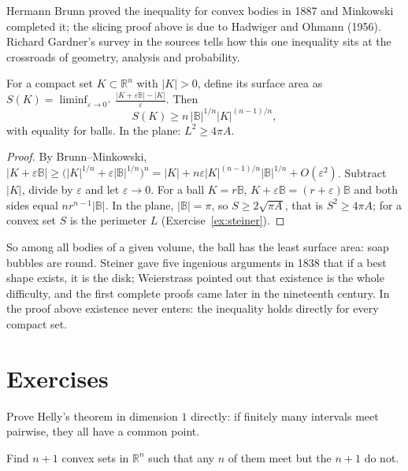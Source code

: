 Hermann Brunn proved the inequality for convex bodies in 1887 and Minkowski completed it; the slicing proof above is due to Hadwiger and Ohmann (1956).
Richard Gardner's survey in the sources tells how this one inequality sits at the crossroads of geometry, analysis and probability.

\begin{corollary}\label{cor:isoperimetric}
For a compact set $K\subset\mathbb R^n$ with $|K|>0$, define its surface area as $S(K)=\liminf_{\varepsilon\to0^+}\frac{|K+\varepsilon\mathbb B|-|K|}\varepsilon$. Then
\[
S(K)\ge n\,|\mathbb B|^{1/n}|K|^{(n-1)/n},
\]
with equality for balls. In the plane: $L^2\ge4\pi A$.
\end{corollary}

\begin{proof}
By Brunn--Minkowski, $|K+\varepsilon\mathbb B|\ge\bigl(|K|^{1/n}+\varepsilon|\mathbb B|^{1/n}\bigr)^n=|K|+n\varepsilon|K|^{(n-1)/n}|\mathbb B|^{1/n}+O(\varepsilon^2)$.
Subtract $|K|$, divide by $\varepsilon$ and let $\varepsilon\to0$. For a ball $K=r\mathbb B$, $K+\varepsilon\mathbb B=(r+\varepsilon)\mathbb B$ and both sides equal
$nr^{n-1}|\mathbb B|$. In the plane, $|\mathbb B|=\pi$, so $S\ge2\sqrt{\pi A}$, that is $S^2\ge4\pi A$; for a convex set $S$ is the perimeter $L$
(Exercise~\ref{ex:steiner}).
\end{proof}

So among all bodies of a given volume, the ball has the least surface area: soap bubbles are round. Steiner gave five ingenious arguments in 1838 that if a
best shape exists, it is the disk; Weierstrass pointed out that existence is the whole difficulty, and the first complete proofs came later in the
nineteenth century. In the proof above existence never enters: the inequality holds directly for every compact set.

\section{Exercises}

\begin{exercise}[$\star$]\label{ex:helly1d}
Prove Helly's theorem in dimension $1$ directly: if finitely many intervals meet pairwise, they all have a common point.
\end{exercise}

\begin{exercise}[$\star$]\label{ex:hellysharp}
Find $n+1$ convex sets in $\mathbb R^n$ such that any $n$ of them meet but the $n+1$ do not.
\end{exercise}

